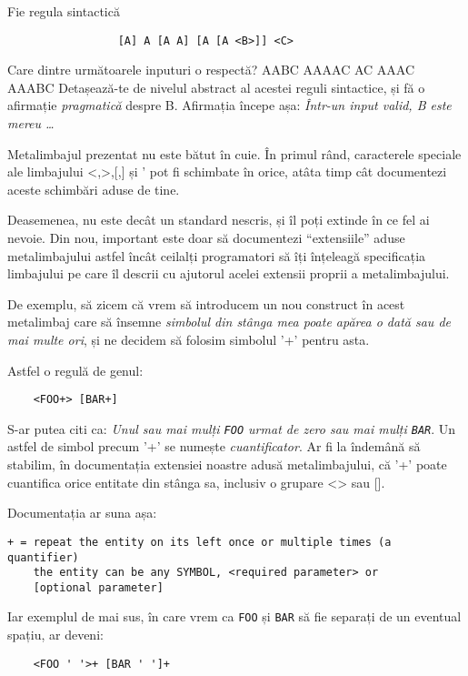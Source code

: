 \begin{Exercise}[title={Reguli sintactice},difficulty=1]
Fie regula sintactică
\begin{verbatim}
                 [A] A [A A] [A [A <B>]] <C>
\end{verbatim}
\ExePart
Care dintre următoarele inputuri o respectă?
\Question AABC %
\Question AAAAC %
\Question AC %
\Question AAAC %
\Question AAABC %
\ExePart
Detașează-te de nivelul abstract al acestei reguli sintactice, și fă o afirmație
\textit{pragmatică} despre B. Afirmația începe așa:
\textit{Într-un input valid, B este mereu \ldots} %
\end{Exercise}

Metalimbajul prezentat nu este bătut în cuie. În primul rând,
caracterele speciale ale limbajului <,>,[,] și ' pot fi schimbate
în orice, atâta timp cât documentezi aceste schimbări aduse de tine.

Deasemenea, nu este decât un standard nescris, și îl poți
extinde în ce fel ai nevoie. Din nou, important este doar
să documentezi ``extensiile'' aduse metalimbajului astfel
încât ceilalți programatori să îți înțeleagă specificația
limbajului pe care îl descrii cu ajutorul acelei
extensii proprii a metalimbajului.

De exemplu, să zicem că vrem să introducem un nou
construct în acest metalimbaj care să însemne \textit{simbolul
din stânga mea poate apărea o dată sau de mai multe ori}, și
ne decidem să folosim simbolul '+' pentru asta.

Astfel o regulă de genul:
\begin{verbatim}
	<FOO+> [BAR+]
\end{verbatim}
S-ar putea citi ca: \textit{Unul sau mai mulți \texttt{FOO} urmat de zero sau mai
mulți \texttt{BAR}}. Un astfel de simbol precum '+' se numește \textsl{cuantificator}.
Ar fi la îndemână să stabilim, în documentația extensiei noastre adusă metalimbajului,
că '+' poate cuantifica orice entitate din stânga sa, inclusiv o grupare <> sau [].

Documentația ar suna așa:
\begin{verbatim}
+ = repeat the entity on its left once or multiple times (a quantifier)
    the entity can be any SYMBOL, <required parameter> or
	[optional parameter]
\end{verbatim}
Iar exemplul de mai sus, în care vrem ca \texttt{FOO} și \texttt{BAR}
să fie separați de un eventual spațiu, ar deveni:
\begin{verbatim}
	<FOO ' '>+ [BAR ' ']+
\end{verbatim}

